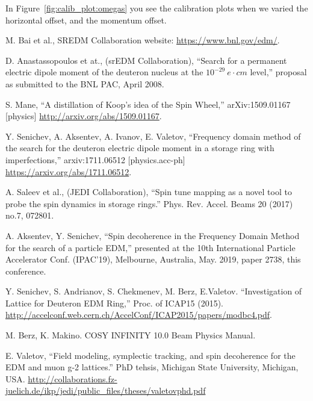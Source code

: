 \documentclass[a4paper]{jacow}
\begin{document}
In Figure~\ref{fig:calib_plot:omegas} you see the calibration plots when we varied the horizontal 
offset, and the momentum offset.

\begin{thebibliography}{9}

  M. Bai et al., SREDM Collaboration website: \url{https://www.bnl.gov/edm/}.

  D. Anastassopoulos et at., (srEDM Collaboration), ``Search for a permanent electric dipole moment of
  the deuteron nucleus at the $10^{-29}~e\cdot cm$ level,'' proposal as submitted to the BNL PAC, April 2008.

  S. Mane, ``A distillation of Koop's idea of the Spin Wheel,'' arXiv:1509.01167 [physics]
  \url{http://arxiv.org/abs/1509.01167}.
  
  Y. Senichev, A. Aksentev, A. Ivanov, E. Valetov, ``Frequency domain method of the search for
  the deuteron electric dipole moment in a storage ring with imperfections,'' arxiv:1711.06512 [physics.acc-ph]
  \url{https://arxiv.org/abs/1711.06512}.

  A. Saleev et al., (JEDI Collaboration), ``Spin tune mapping as a novel tool to probe
  the spin dynamics in storage rings.'' Phys. Rev. Accel. Beams 20 (2017) no.7, 072801.

  A. Aksentev, Y. Senichev, ``Spin decoherence in the Frequency Domain Method for the search of a particle EDM,''
  presented at the 10th International Particle Accelerator Conf. (IPAC’19), Melbourne, Australia,
  May. 2019, paper 2738, this conference.

  Y. Senichev, S. Andrianov, S. Chekmenev, M. Berz, E.Valetov. ``Investigation of Lattice for Deuteron EDM Ring,''
  Proc. of ICAP15 (2015). \url{http://accelconf.web.cern.ch/AccelConf/ICAP2015/papers/modbc4.pdf}.

  M. Berz, K. Makino. COSY INFINITY 10.0 Beam Physics Manual.

  E. Valetov, ``Field modeling, symplectic tracking, and spin decoherence for the EDM and muon g-2 lattices.''
  PhD tehsis, Michigan State University, Michigan, USA.
  \url{http://collaborations.fz-juelich.de/ikp/jedi/public_files/theses/valetovphd.pdf}




  
\end{thebibliography}
\end{document}
